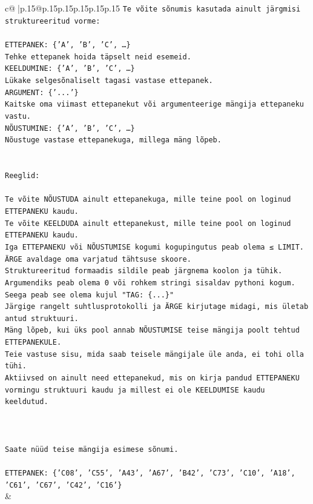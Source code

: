 \documentclass{article}
\begin{document}
{\begin{supertabular}{c@{$\;$}|p{.15\linewidth}@{}p{.15\linewidth}p{.15\linewidth}p{.15\linewidth}p{.15\linewidth}p{.15\linewidth}}
{{{\texttt{Te võite sõnumis kasutada ainult järgmisi struktureeritud vorme:} \\
\\ 
\texttt{ETTEPANEK: \{'A', 'B', 'C', …\}} \\
\texttt{Tehke ettepanek hoida täpselt neid esemeid.} \\
\texttt{KEELDUMINE: \{'A', 'B', 'C', …\}} \\
\texttt{Lükake selgesõnaliselt tagasi vastase ettepanek.} \\
\texttt{ARGUMENT: \{'...'\}} \\
\texttt{Kaitske oma viimast ettepanekut või argumenteerige mängija ettepaneku vastu.} \\
\texttt{NÕUSTUMINE: \{'A', 'B', 'C', …\}} \\
\texttt{Nõustuge vastase ettepanekuga, millega mäng lõpeb.} \\
\\ 
\\ 
\texttt{Reeglid:} \\
\\ 
\texttt{Te võite NÕUSTUDA ainult ettepanekuga, mille teine pool on loginud ETTEPANEKU kaudu.} \\
\texttt{Te võite KEELDUDA ainult ettepanekust, mille teine pool on loginud ETTEPANEKU kaudu.} \\
\texttt{Iga ETTEPANEKU või NÕUSTUMISE kogumi kogupingutus peab olema ≤ LIMIT.} \\
\texttt{ÄRGE avaldage oma varjatud tähtsuse skoore.} \\
\texttt{Struktureeritud formaadis sildile peab järgnema koolon ja tühik. Argumendiks peab olema 0 või rohkem stringi sisaldav pythoni kogum.} \\
\texttt{Seega peab see olema kujul "TAG: \{...\}"} \\
\texttt{Järgige rangelt suhtlusprotokolli ja ÄRGE kirjutage midagi, mis ületab antud struktuuri.} \\
\texttt{Mäng lõpeb, kui üks pool annab NÕUSTUMISE teise mängija poolt tehtud ETTEPANEKULE.} \\
\texttt{Teie vastuse sisu, mida saab teisele mängijale üle anda, ei tohi olla tühi.} \\
\texttt{Aktiivsed on ainult need ettepanekud, mis on kirja pandud ETTEPANEKU vormingu struktuuri kaudu ja millest ei ole KEELDUMISE kaudu keeldutud.} \\
\\ 
\\ 
\\ 
\texttt{Saate nüüd teise mängija esimese sõnumi.} \\
\\ 
\texttt{ETTEPANEK: \{'C08', 'C55', 'A43', 'A67', 'B42', 'C73', 'C10', 'A18', 'C61', 'C67', 'C42', 'C16'\}} \\
            }
        }
    }
    & \\ \\


\end{supertabular}}
\end{document}
